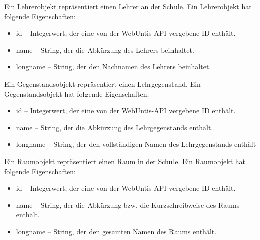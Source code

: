 Ein Lehrerobjekt repräsentiert einen Lehrer an der Schule. Ein Lehrerobjekt hat folgende Eigenschaften: 

\begin{itemize}
    \item id -- Integerwert, der eine von der WebUntis-API vergebene ID enthält.
    \item name -- String, der die Abkürzung des Lehrers beinhaltet.
    \item longname -- String, der den Nachnamen des Lehrers beinhaltet. 
\end{itemize}


Ein Gegenstandsobjekt repräsentiert einen Lehrgegenstand. Ein Gegenstandsobjekt hat folgende Eigenschaften: 

\begin{itemize}
    \item id -- Integerwert, der eine von der WebUntis-API vergebene ID enthält. 
    \item name -- String, der die Abkürzung des Lehrgegenstands enthält.
    \item longname -- String, der den vollständigen Namen des Lehrgegenstands enthält
\end{itemize}


\pagebreak

Ein Raumobjekt repräsentiert einen Raum in der Schule. Ein Raumobjekt hat folgende Eigenschaften: 

\begin{itemize}
    \item id -- Integerwert, der eine von der WebUntis-API vergebene ID enthält.
    \item name -- String, der die Abkürzung bzw. die Kurzschreibweise des Raums enthält.
    \item longname -- String, der den gesamten Namen des Raums enthält. 
\end{itemize}